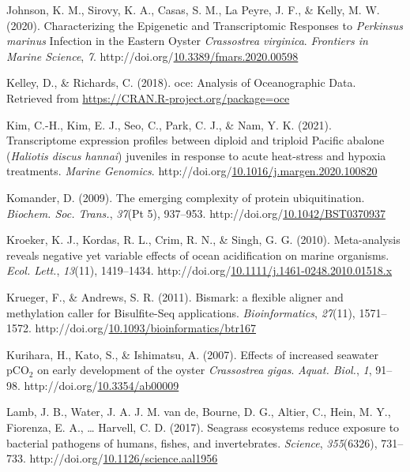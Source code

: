 \documentclass [11pt, proquest] {uwthesis}[2015/03/03]
\newlength{\cslhangindent}
\newenvironment{CSLReferences}%
{\setlength{\parindent}{0pt}%
\everypar{\setlength{\hangindent}{\cslhangindent}}\ignorespaces}%
{\par}
\begin{document}
\begin{CSLReferences}{1}{0}
\leavevmode\hypertarget{ref-Johnson2020}{}%
Johnson, K. M., Sirovy, K. A., Casas, S. M., La Peyre, J. F., \& Kelly, M. W. (2020). {Characterizing the Epigenetic and Transcriptomic Responses to \emph{Perkinsus marinus} Infection in the Eastern Oyster \emph{Crassostrea virginica}}. \emph{Frontiers in Marine Science}, \emph{7}. http://doi.org/\href{https://doi.org/10.3389/fmars.2020.00598}{10.3389/fmars.2020.00598}

\leavevmode\hypertarget{ref-Kelley2018}{}%
Kelley, D., \& Richards, C. (2018). {oce: Analysis of Oceanographic Data}. Retrieved from \url{https://CRAN.R-project.org/package=oce}

\leavevmode\hypertarget{ref-Kim2021}{}%
Kim, C.-H., Kim, E. J., Seo, C., Park, C. J., \& Nam, Y. K. (2021). {Transcriptome expression profiles between diploid and triploid Pacific abalone (\emph{Haliotis discus hannai}) juveniles in response to acute heat-stress and hypoxia treatments}. \emph{Marine Genomics}. http://doi.org/\href{https://doi.org/10.1016/j.margen.2020.100820}{10.1016/j.margen.2020.100820}

\leavevmode\hypertarget{ref-Komander2009}{}%
Komander, D. (2009). {The emerging complexity of protein ubiquitination}. \emph{Biochem. Soc. Trans.}, \emph{37}(Pt 5), 937--953. http://doi.org/\href{https://doi.org/10.1042/BST0370937}{10.1042/BST0370937}

\leavevmode\hypertarget{ref-Kroeker2010}{}%
Kroeker, K. J., Kordas, R. L., Crim, R. N., \& Singh, G. G. (2010). {Meta-analysis reveals negative yet variable effects of ocean acidification on marine organisms}. \emph{Ecol. Lett.}, \emph{13}(11), 1419--1434. http://doi.org/\href{https://doi.org/10.1111/j.1461-0248.2010.01518.x}{10.1111/j.1461-0248.2010.01518.x}

\leavevmode\hypertarget{ref-Krueger2011}{}%
Krueger, F., \& Andrews, S. R. (2011). {Bismark: a flexible aligner and methylation caller for Bisulfite-Seq applications}. \emph{Bioinformatics}, \emph{27}(11), 1571--1572. http://doi.org/\href{https://doi.org/10.1093/bioinformatics/btr167}{10.1093/bioinformatics/btr167}

\leavevmode\hypertarget{ref-Kurihara2007}{}%
Kurihara, H., Kato, S., \& Ishimatsu, A. (2007). {Effects of increased seawater {pCO\(_2\)} on early development of the oyster \emph{Crassostrea gigas}}. \emph{Aquat. Biol.}, \emph{1}, 91--98. http://doi.org/\href{https://doi.org/10.3354/ab00009}{10.3354/ab00009}

\leavevmode\hypertarget{ref-Lamb2017}{}%
Lamb, J. B., Water, J. A. J. M. van de, Bourne, D. G., Altier, C., Hein, M. Y., Fiorenza, E. A., \ldots{} Harvell, C. D. (2017). {Seagrass ecosystems reduce exposure to bacterial pathogens of humans, fishes, and invertebrates}. \emph{Science}, \emph{355}(6326), 731--733. http://doi.org/\href{https://doi.org/10.1126/science.aal1956}{10.1126/science.aal1956}


\end{CSLReferences}
\end{document}
